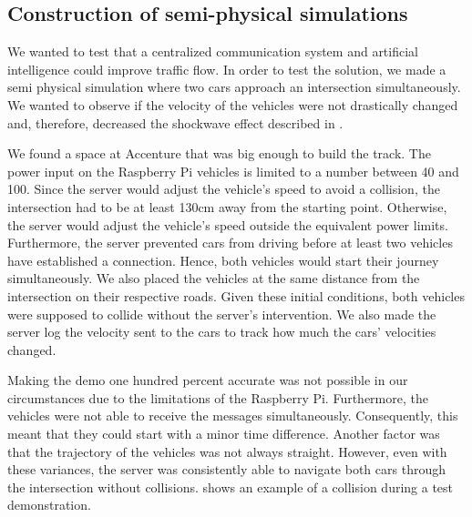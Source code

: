 \subsection{Construction of semi-physical simulations}\label{sec:demo}
We wanted to test that a centralized communication system and artificial intelligence could improve traffic flow. In order to test the solution, we made a semi physical simulation where two cars approach an intersection simultaneously. We wanted to observe if the velocity of the vehicles were not drastically changed and, therefore, decreased the shockwave effect described in .

We found a space at Accenture that was big enough to build the track. The power input on the Raspberry Pi vehicles is limited to a number between 40 and 100.  Since the server would adjust the vehicle's speed to avoid a collision, the intersection had to be at least 130cm away from the starting point. Otherwise, the server would adjust the vehicle's speed outside the equivalent power limits. Furthermore, the server prevented cars from driving before at least two vehicles have established a connection. Hence, both vehicles would start their journey simultaneously. We also placed the vehicles at the same distance from the intersection on their respective roads. Given these initial conditions, both vehicles were supposed to collide without the server's intervention. We also made the server log the velocity sent to the cars to track how much the cars' velocities changed.

Making the demo one hundred percent accurate was not possible in our circumstances due to the limitations of the Raspberry Pi. Furthermore, the vehicles were not able to receive the messages simultaneously. Consequently, this meant that they could start with a minor time difference. Another factor was that the trajectory of the vehicles was not always straight. However, even with these variances, the server was consistently able to navigate both cars through the intersection without collisions.  shows an example of a collision during a test demonstration.

